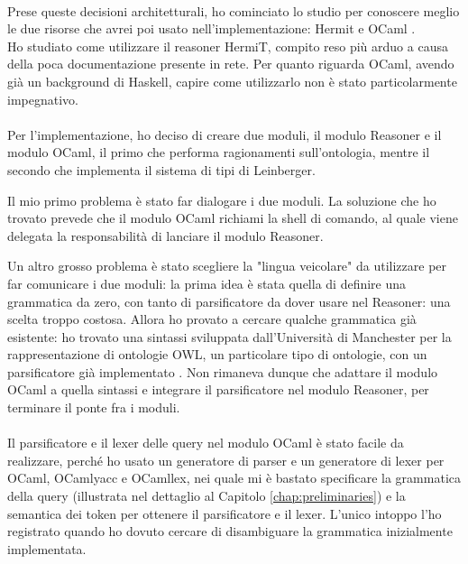 \paragraph{} Prese queste decisioni architetturali, ho cominciato lo studio per conoscere meglio le due risorse che avrei poi usato nell'implementazione: Hermit \cite{HermiT} e OCaml \cite{}.\\
Ho studiato come utilizzare il reasoner HermiT, compito reso più arduo a causa della poca documentazione presente in rete. Per quanto riguarda OCaml, avendo già un background di Haskell, capire come utilizzarlo non è stato particolarmente impegnativo. \\

\paragraph{} Per l'implementazione, ho deciso di creare due moduli, il modulo Reasoner e il modulo OCaml, il primo che performa ragionamenti sull'ontologia, mentre il secondo che implementa il sistema di tipi di Leinberger.

Il mio primo problema è stato far dialogare i due moduli. La soluzione che ho trovato prevede che il modulo OCaml richiami la shell di comando, al quale viene delegata la responsabilità di lanciare il modulo Reasoner.

Un altro grosso problema è stato scegliere la "lingua veicolare" da utilizzare per far comunicare i due moduli: la prima idea è stata quella di definire una grammatica da zero, con tanto di parsificatore da dover usare nel Reasoner: una scelta troppo costosa. Allora ho provato a cercare qualche grammatica già esistente: ho trovato una sintassi sviluppata dall'Università di Manchester per la rappresentazione di ontologie OWL, un particolare tipo di ontologie, con un parsificatore già implementato \cite{}. Non rimaneva dunque che adattare il modulo OCaml a quella sintassi e integrare il parsificatore nel modulo Reasoner, per terminare il ponte fra i moduli.

\paragraph{} Il parsificatore e il lexer delle query nel modulo OCaml è stato facile da realizzare, perché ho usato un generatore di parser e un generatore di lexer per OCaml, OCamlyacc e OCamllex, nei quale mi è bastato specificare la grammatica della query (illustrata nel dettaglio al Capitolo \ref{chap:preliminaries}) e la semantica dei token per ottenere il parsificatore e il lexer. L'unico intoppo l'ho registrato quando ho dovuto cercare di disambiguare la grammatica inizialmente implementata. 

